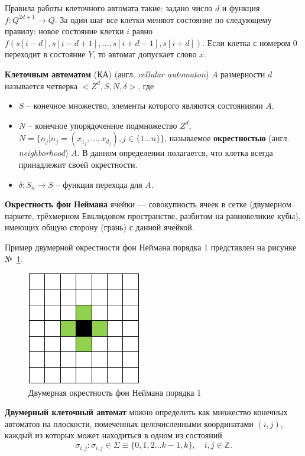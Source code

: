 \documentclass[a4paper, final]{article}
\begin{document}
Правила работы клеточного автомата такие: задано число $d$ и функция $f: Q^{2d+1} \rightarrow Q$. 
За один шаг все клетки меняют состояние по следующему правилу: новое состояние клетки $i$ равно 
$f(s[i-d],s[i-d+1],\dots,s[i+d-1],s[i+d])$. Если клетка с номером 0 переходит в состояние $Y$, 
то автомат допускает слово $x$.

\textbf{Клеточным автоматом} (КА) (англ. \textit{cellular automaton}) $A$ размерности $d$ 
называется четверка $<Z^d,S,N,\delta>$, где
\begin{itemize}
\item $S$ -- конечное множество, элементы которого являются состояниями $A$.
\item $N$ -- конечное упорядоченное подмножество $Z^d$, $N=\{n_j | n_j = (x_{1_j},\dots,x_{d_j}),
j \in \{1 \dots n\}\}$, называемое \textbf{окрестностью} (англ. \textit{neighborhood}) $A$.
В данном определении полагается, что клетка всегда принадлежит своей окрестности.
\item $\delta : S_n \rightarrow S$ -- функция перехода для $A$. \cite{bib:linearcellularautomaton}
\end{itemize}

\textbf{Окрестность фон Неймана} ячейки --- совокупность ячеек в сетке 
(двумерном паркете, трёхмерном Евклидовом пространстве, разбитом на равновеликие кубы), 
имеющих общую сторону (грань) с данной ячейкой. \cite{bib:cellularautomaton}

Пример двумерной окрестности фон Неймана порядка 1 представлен на рисунке №~\ref{img:neyman}.
\begin{figure}[H]
   \centering
   \includegraphics[scale=1]{neyman.png}
   \caption{Двумерная окрестность фон Неймана порядка 1}
   \label{img:neyman}
\end{figure}

\textbf{Двумерный клеточный автомат} можно определить как множество конечных автоматов на плоскости, 
помеченных целочисленными координатами $(i, j)$, каждый из которых может находиться в одном из состояний
$$\sigma _{i,j}: \sigma _{i,j}\in \Sigma \equiv \{0,1,2...k-1,k\}, \quad i, j \in \mathbb{Z}.$$
\end{document}
